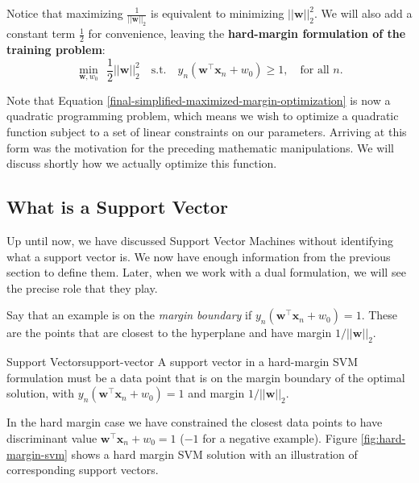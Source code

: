 Notice that maximizing $\frac{1}{||\textbf{w}||_2}$ is equivalent to minimizing $||\textbf{w}||_2^{2}$. We will also add a constant term $\frac{1}{2}$ for convenience, leaving the {\bf hard-margin formulation of the training problem}:
%
\begin{equation} \label{final-simplified-maximized-margin-optimization}
	\underset{\textbf{w}, w_{0}}{\min}\ \  \frac{1}{2} ||\textbf{w}||_2^{2} \quad \text{s.t.} \quad y_{n}(\textbf{w}^\top\textbf{x}_{n} + w_{0}) \geq 1, \quad \mbox{for all $n$}.
\end{equation}

Note that Equation \ref{final-simplified-maximized-margin-optimization} is now a quadratic programming problem, which means we wish to optimize a quadratic function subject to a set of linear constraints on our parameters. Arriving at this form was the motivation for the preceding mathematic manipulations. We will discuss shortly how we actually optimize this function.

\subsection{What is a Support Vector}

Up until now, we have discussed Support Vector Machines without identifying what a support vector is. We now have enough information from the previous section to define them. Later, when we work with a dual formulation, we will see the precise role that they play.

Say that an
example is on the {\em margin boundary}
if $y_{n}(\textbf{w}^\top\textbf{x}_{n} + w_{0}) =1$. These are the points that are closest to the hyperplane and have margin $1/||{\mathbf w}||_2$.
%
\begin{definition}{Support Vector}{support-vector}
  A support vector in a  hard-margin SVM  formulation  must be a data point that is on
  the margin boundary of the optimal solution, with $y_{n}(\textbf{w}^\top\textbf{x}_{n} + w_{0}) =1$ and margin $1/||{\mathbf w}||_2$.
\end{definition}

In the hard margin case we have constrained the closest data points to
have discriminant value $\textbf{w}^\top\textbf{x}_{n} + w_{0} = 1$ ($-1$ for a negative example).
Figure \ref{fig:hard-margin-svm} shows a hard margin SVM solution with an illustration of
corresponding support vectors.



